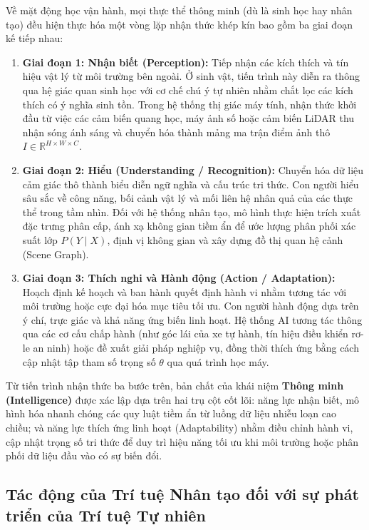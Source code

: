 Về mặt động học vận hành, mọi thực thể thông minh (dù là sinh học hay nhân tạo) đều hiện thực hóa một vòng lặp nhận thức khép kín bao gồm ba giai đoạn kế tiếp nhau:

\begin{enumerate}
    \item \textbf{Giai đoạn 1: Nhận biết (Perception):} Tiếp nhận các kích thích và tín hiệu vật lý từ môi trường bên ngoài. Ở sinh vật, tiến trình này diễn ra thông qua hệ giác quan sinh học với cơ chế chú ý tự nhiên nhằm chắt lọc các kích thích có ý nghĩa sinh tồn. Trong hệ thống thị giác máy tính, nhận thức khởi đầu từ việc các cảm biến quang học, máy ảnh số hoặc cảm biến LiDAR thu nhận sóng ánh sáng và chuyển hóa thành mảng ma trận điểm ảnh thô $I \in \mathbb{R}^{H \times W \times C}$.
    \item \textbf{Giai đoạn 2: Hiểu (Understanding / Recognition):} Chuyển hóa dữ liệu cảm giác thô thành biểu diễn ngữ nghĩa và cấu trúc tri thức. Con người hiểu sâu sắc về công năng, bối cảnh vật lý và mối liên hệ nhân quả của các thực thể trong tầm nhìn. Đối với hệ thống nhân tạo, mô hình thực hiện trích xuất đặc trưng phân cấp, ánh xạ không gian tiềm ẩn để ước lượng phân phối xác suất lớp $P(Y \mid X)$, định vị không gian và xây dựng đồ thị quan hệ cảnh (Scene Graph).
    \item \textbf{Giai đoạn 3: Thích nghi và Hành động (Action / Adaptation):} Hoạch định kế hoạch và ban hành quyết định hành vi nhằm tương tác với môi trường hoặc cực đại hóa mục tiêu tối ưu. Con người hành động dựa trên ý chí, trực giác và khả năng ứng biến linh hoạt. Hệ thống AI tương tác thông qua các cơ cấu chấp hành (như góc lái của xe tự hành, tín hiệu điều khiển rơ-le an ninh) hoặc đề xuất giải pháp nghiệp vụ, đồng thời thích ứng bằng cách cập nhật tập tham số trọng số $\theta$ qua quá trình học máy.
\end{enumerate}

Từ tiến trình nhận thức ba bước trên, bản chất của khái niệm \textbf{Thông minh (Intelligence)} được xác lập dựa trên hai trụ cột cốt lõi: năng lực nhận biết, mô hình hóa nhanh chóng các quy luật tiềm ẩn từ luồng dữ liệu nhiễu loạn cao chiều; và năng lực thích ứng linh hoạt (Adaptability) nhằm điều chỉnh hành vi, cập nhật trọng số tri thức để duy trì hiệu năng tối ưu khi môi trường hoặc phân phối dữ liệu đầu vào có sự biến đổi.

\subsection{Tác động của Trí tuệ Nhân tạo đối với sự phát triển của Trí tuệ Tự nhiên}


